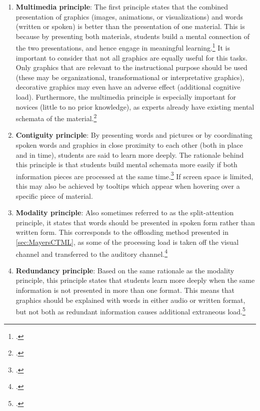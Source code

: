 \begin{enumerate}
    \item \textbf{Multimedia principle}: The first principle states that the combined presentation of graphics (images, animations, or visualizations) and words (written or spoken) is better than the presentation of one material. This is because by presenting both materials, students build a mental connection of the two presentations, and hence engage in meaningful learning.\footcites[Cf.][p.19]{MayerAnimationAidMultimedia2001}[cf.][chapter 4, paragraph 7]{ClarkElearningscienceinstruction2016}[cf.][p.13]{MayerCognitiveTheoryMultimedia1999} It is important to consider that not all graphics are equally useful for this tasks. Only graphics that are relevant to the instructional purpose should be used (these may be organizational, transformational or interpretative graphics), decorative graphics may even have an adverse effect (additional cognitive load). Furthermore, the multimedia principle is especially important for novices (little to no prior knowledge), as experts already have existing mental schemata of the material.\footcites[Cf.][chapter 4, paragraphs 7 et seq]{ClarkElearningscienceinstruction2016}[cf. in addition][]{MayerWhenillustrationworth1990}
    \item \textbf{Contiguity principle}: By presenting words and pictures or by coordinating spoken words and graphics in close proximity to each other (both in place and in time), students are said to learn more deeply. The rationale behind this principle is that students build mental schemata more easily if both information pieces are processed at the same time.\footcites[Cf.][pp. 19 et seq]{MayerAnimationAidMultimedia2001}[cf.][chapter 5, paragraphs 1 et seq.]{ClarkElearningscienceinstruction2016} If screen space is limited, this may also be achieved by tooltips which appear when hovering over a specific piece of material.
    \item \textbf{Modality principle}: Also sometimes referred to as the split-attention principle, it states that words should be presented in spoken form rather than written form. This corresponds to the offloading method presented in \ref{sec:MayersCTML}, as some of the processing load is taken off the visual channel and transferred to the auditory channel.\footcites[Cf.][p.22]{MayerAnimationAidMultimedia2001}[cf.][p.14]{MayerCognitiveTheoryMultimedia1999}
    \item \textbf{Redundancy principle}: Based on the same rationale as the modality principle, this principle states that students learn more deeply when the same information is not presented in more than one format. This means that graphics should be explained with words in either audio or written format, but not both as redundant information causes additional extraneous load.\footcites[Cf.][chapters 6 and 7]{ClarkElearningscienceinstruction2016}[cf.][p.6]{MayerMultimediaLearning2009}[cf.][p.22]{MayerAnimationAidMultimedia2001}[cf. in addition][]{MayerPrinciplesreducingextraneous2014}

\end{enumerate}
